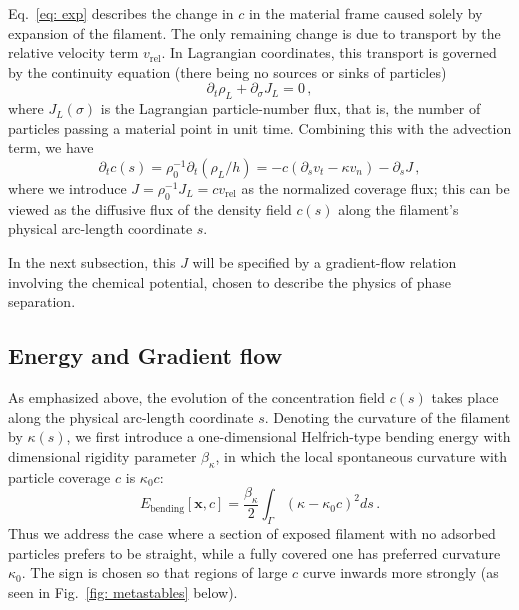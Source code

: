 \documentclass[
aip,
jcp,
reprint, 
floatfix
]{revtex4-1}
\begin{document}
Eq.~\eqref{eq: exp} describes the change in $c$ in the material frame caused solely by expansion of the filament. The only remaining change is due to transport by the relative velocity term $v_\text{rel}$.  In Lagrangian coordinates, this transport is governed by the continuity equation (there being no sources or sinks of particles)
\begin{equation}
    \partial_t \rho_L + \partial_\sigma J_L =0\,,
    \label{eq:lagrangian_conservation}
\end{equation}
where $J_L(\sigma)$ is the Lagrangian particle-number flux, that is, the number of particles passing a material point in unit time. Combining this with the advection term, we have
\begin{equation} \label{eq: c_t}
    \partial_t c(s)  =\rho_0^{-1} \partial_t\left(\rho_L /h\right)
=-c\left(\partial_s v_t-\kappa v_n\right) - \partial_s J \,,
\end{equation}
where we introduce $J = \rho_0^{-1} J_L=cv_{\mathrm{rel}}$ as the normalized coverage flux; this can be viewed as the diffusive flux of the density field $c(s)$ along the filament's physical arc-length coordinate $s$. 

In the next subsection, this $J$ will be specified by a gradient-flow relation involving the chemical potential, chosen to describe the physics of phase separation. 

\subsection{Energy and Gradient flow}
\label{sec: fieldenergy}
As emphasized above, the evolution of the concentration field $c(s)$ takes place along the physical arc-length coordinate $s$. Denoting the curvature of the filament by $\kappa(s)$, we first introduce a one-dimensional Helfrich-type bending energy with dimensional rigidity parameter $\beta_{\kappa}$,  in which the local spontaneous curvature with particle coverage $c$ is $\kappa_{0} c$:
\begin{equation}\label{eq: bend}
    E_{\text {bending}}[\mathbf{x},c]=\frac{\beta_{\kappa}}{2} \int_{\Gamma}\left(\kappa-\kappa_0c\right)^2 d s\,.
\end{equation}
Thus we address the case where a section of exposed filament with no adsorbed particles prefers to be straight, while a fully covered one has preferred curvature $\kappa_0$. The sign is chosen so that regions of large $c$ curve inwards more strongly (as seen in Fig.~\ref{fig: metastables} below).
\end{document}

